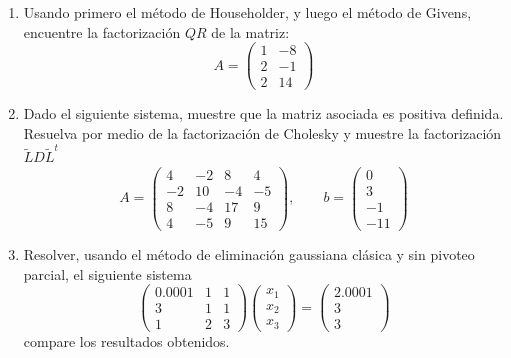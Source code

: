 \documentclass[12pt,letterpaper]{article}
\theoremstyle{plain}
\begin{document}
\begin{enumerate}
\item Usando primero el m\'etodo de Householder, y luego el m\'etodo de Givens, encuentre la factorizaci\'on $QR$ de la matriz:
$$
A=\left(\begin{array}{cc}
      1 & -8 \\
      2 & -1 \\
      2 & 14  
      \end{array}\right)
$$

\item Dado el siguiente sistema, muestre que la matriz asociada es positiva definida. Resuelva por medio de la factorizaci\'on de Cholesky y muestre la factorizaci\'on $ \tilde L D \tilde L^t$
$$
A=\left(\begin{array}{cccc}
      4 & -2 & 8 & 4 \\
      -2 & 10 & -4 & -5 \\
      8 & -4 & 17 & 9\\
      4 & -5 & 9 & 15
      \end{array}\right), \qquad b=\left(\begin{array}{c}
      0 \\
      3\\
      -1 \\
      -11 
      \end{array}\right)
$$

\item Resolver, usando el m\'etodo de eliminaci\'on gaussiana cl\'asica y sin pivoteo parcial, el siguiente sistema
$$
\left(\begin{array}{ccc}
      0.0001 & 1 & 1  \\
      3 & 1 & 1  \\
      1 & 2 & 3 
      \end{array}\right)\left(\begin{array}{c}
      x_1 \\
      x_2\\
      x_3 
      \end{array}\right)=\left(\begin{array}{c}
      2.0001 \\
      3\\
      3 
      \end{array}\right)
$$
compare los resultados obtenidos.


\end{enumerate}
\end{document}
